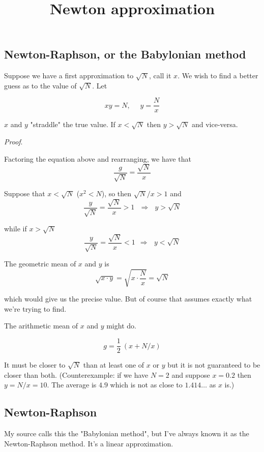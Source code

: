 \documentclass[11pt, oneside]{article}
\title{Newton approximation}
\date{}
\begin{document}
\maketitle
\Large


\subsection*{Newton-Raphson, or the Babylonian method}

Suppose we have a first approximation to $\sqrt{N}$, call it $x$.  We wish to find a better guess as to the value of $\sqrt{N}$.  Let

\[ xy = N, \ \ \ \ \ \ y = \frac{N}{x} \]

$x$ and $y$ "straddle" the true value.  If $x < \sqrt{N}$ then $y > \sqrt{N}$ and vice-versa.

\emph{Proof}.  

Factoring the equation above and rearranging, we have that
\[ \frac{g}{\sqrt{N}} = \frac{\sqrt{N}}{x} \]

Suppose that $x < \sqrt{N}$ ($x^2 < N$), so then $\sqrt{N}/x > 1$ and
\[ \frac{y}{\sqrt{N}} = \frac{\sqrt{N}}{x}  > 1 \ \ \ \Rightarrow \ \ \  y > \sqrt{N} \]

while if $x > \sqrt{N}$
\[ \frac{y}{\sqrt{N}} = \frac{\sqrt{N}}{x} < 1 \ \ \Rightarrow \ \ \  y < \sqrt{N} \]

The geometric mean of $x$ and $y$ is
\[ \sqrt{x \cdot y} = \sqrt{x \cdot \frac{N}{x}} = \sqrt{N} \]

which would give us the precise value.  But of course that assumes exactly what we're trying to find.  

The arithmetic mean of $x$ and $y$ might do.  

\[ g = \frac{1}{2} \ (x + N/x) \]

It must be closer to $\sqrt{N}$ than at least one of $x$ or $y$ but it is not guaranteed to be closer than both.  (Counterexample:  if we have $N = 2$ and suppose $x = 0.2$ then $y = N/x = 10$.  The average is $4.9$ which is not as close to $1.414 \dots$ as $x$ is.)

\subsection*{Newton-Raphson}

My source calls this the "Babylonian method", but I've always known it as the Newton-Raphson method.  It's a linear approximation.  
\end{document}
